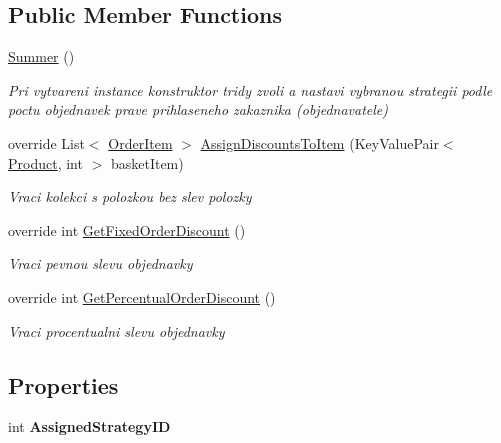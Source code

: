 \subsection*{Public Member Functions}
\begin{DoxyCompactItemize}
\item 
\mbox{\hyperlink{class_eshop_1_1_summer_ae45885f55eff0d151906fa6fc8a81fb3}{Summer}} ()
\begin{DoxyCompactList}\small\item\em Pri vytvareni instance konstruktor tridy zvoli a nastavi vybranou strategii podle poctu objednavek prave prihlaseneho zakaznika (objednavatele) \end{DoxyCompactList}\item 
override List$<$ \mbox{\hyperlink{class_eshop_1_1_order_item}{Order\+Item}} $>$ \mbox{\hyperlink{class_eshop_1_1_summer_ae35f16e3f104e0ef827771c32a35a3d6}{Assign\+Discounts\+To\+Item}} (Key\+Value\+Pair$<$ \mbox{\hyperlink{class_eshop_1_1_product}{Product}}, int $>$ basket\+Item)
\begin{DoxyCompactList}\small\item\em Vraci kolekci s polozkou bez slev polozky \end{DoxyCompactList}\item 
override int \mbox{\hyperlink{class_eshop_1_1_summer_a762d12ed77cc1dfa28b13a487fd0c0ae}{Get\+Fixed\+Order\+Discount}} ()
\begin{DoxyCompactList}\small\item\em Vraci pevnou slevu objednavky \end{DoxyCompactList}\item 
override int \mbox{\hyperlink{class_eshop_1_1_summer_a3b3b71b9a83e117fb3b5a2a7e3da3a1a}{Get\+Percentual\+Order\+Discount}} ()
\begin{DoxyCompactList}\small\item\em Vraci procentualni slevu objednavky \end{DoxyCompactList}\end{DoxyCompactItemize}
\subsection*{Properties}
\begin{DoxyCompactItemize}
\item 
\mbox{\label{class_eshop_1_1_summer_adfbad32d082d73db9dbd86b728f4fa3c}} 
int {\bfseries Assigned\+Strategy\+ID}
\end{DoxyCompactItemize}
